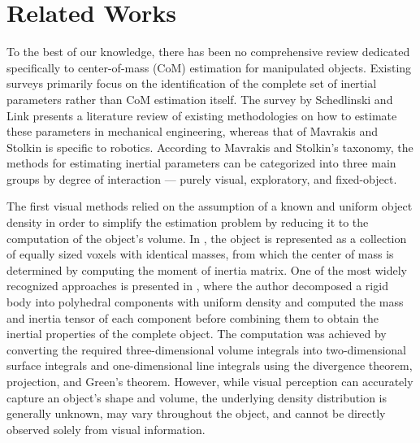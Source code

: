 \section{Related Works}
\label{sec:related}
To the best of our knowledge, there has been no comprehensive review dedicated specifically to center-of-mass (CoM) estimation for manipulated objects. Existing surveys primarily focus on the identification of the complete set of inertial parameters rather than CoM estimation itself. The survey by Schedlinski and Link \cite{Schedlinski2001Survey} presents a literature review of existing methodologies on how to estimate these parameters in mechanical engineering, whereas that of Mavrakis and Stolkin \cite{liu2022inertialsurvey} is specific to robotics. According to Mavrakis and Stolkin's taxonomy, the methods for estimating inertial parameters can be categorized into three main groups by degree of interaction — purely visual, exploratory, and fixed-object.

The first visual methods relied on the assumption of a known and uniform object density in order to simplify the estimation problem by reducing it to the computation of the object's volume. In \cite{Chien1986Identification}, the object is represented as a collection of equally sized voxels with identical masses, from which the center of mass is determined by computing the moment of inertia matrix. One of the most widely recognized approaches is presented in \cite{Mirtich1996MassProperties}, where the author decomposed a rigid body into polyhedral components with uniform density and computed the mass and inertia tensor of each component before combining them to obtain the inertial properties of the complete object. The computation was achieved by converting the required three-dimensional volume integrals into two-dimensional surface integrals and one-dimensional line integrals using the divergence theorem, projection, and Green's theorem. However, while visual perception can accurately capture an object's shape and volume, the underlying density distribution is generally unknown, may vary throughout the object, and cannot be directly observed solely from visual information.

